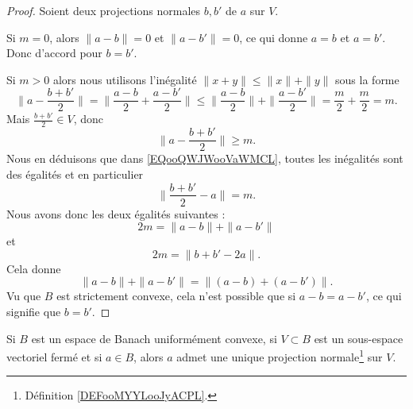 \begin{proof}
	Soient deux projections normales \( b,b'\) de \( a\) sur \( V\).

	Si \( m=0\), alors \( \| a-b \|=0\) et \( \| a-b' \|=0\), ce qui donne \( a=b\) et \( a=b'\). Donc d'accord pour \( b=b'\).

	Si \( m>0\) alors nous utilisons l'inégalité \( \| x+y \|\leq \| x \|+\| y \|\) sous la forme
	\begin{equation}        \label{EQooQWJWooVaWMCL}
		\| a-\frac{ b+b' }{ 2 } \|=\| \frac{ a-b }{2}+\frac{ a-b' }{2} \|\leq \| \frac{ a-b }{2} \|+\| \frac{ a-b' }{2} \|=\frac{ m }{ 2 }+\frac{ m }{2}=m.
	\end{equation}
	Mais \( \frac{ b+b' }{2}\in V\), donc
	\begin{equation}
		\| a-\frac{ b+b' }{2} \|\geq m.
	\end{equation}
	Nous en déduisons que dans \eqref{EQooQWJWooVaWMCL}, toutes les inégalités sont des égalités et en particulier
	\begin{equation}
		\| \frac{ b+b' }{2}-a \|=m.
	\end{equation}
	Nous avons donc les deux égalités suivantes :
	\begin{equation}
		2m=\| a-b \|+\| a-b' \|
	\end{equation}
	et
	\begin{equation}
		2m=\| b+b'-2a \|.
	\end{equation}
	Cela donne
	\begin{equation}
		\| a-b \|+\| a-b' \|=\| (a-b)+(a-b') \|.
	\end{equation}
	Vu que \( B\) est strictement convexe, cela n'est possible que si \( a-b=a-b'\), ce qui signifie que \( b=b'\).
\end{proof}

\begin{theorem}     \label{THOooOOVVooMhzHqd}
	Si \( B\) est un espace de Banach uniformément convexe, si \( V\subset B\) est un sous-espace vectoriel fermé et si \( a\in B\), alors \( a\) admet une unique projection normale\footnote{Définition \ref{DEFooMYYLooJyACPL}.} sur \( V\).
\end{theorem}

